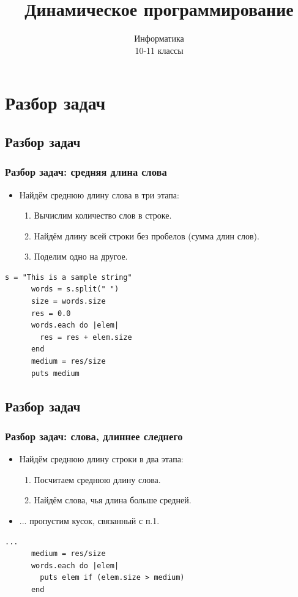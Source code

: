 \documentclass[compress,red]{beamer}
\title{Динамическое программирование}
\author{Информатика \\ 10-11 классы}
\begin{document}
\maketitle

\section{Разбор задач}
\subsection{Разбор задач}
\begin{frame}[fragile]
\frametitle{Разбор задач: средняя длина слова}
		\begin{itemize}
		\item Найдём среднюю длину слова в три этапа:
		  \begin{enumerate}
		    \item Вычислим количество слов в строке.
		    \item Найдём длину всей строки без пробелов (сумма длин слов).
		    \item Поделим одно на другое.
		  \end{enumerate}
		\end{itemize}
		\scriptsize{
    \begin{lstlisting}[label=ruby1,caption=Средняя длина слова]
      s = "This is a sample string"
      words = s.split(" ")
      size = words.size
      res = 0.0
      words.each do |elem|
        res = res + elem.size
      end
      medium = res/size
      puts medium
    \end{lstlisting}}
\end{frame}

\subsection{Разбор задач}
\begin{frame}[fragile]
\frametitle{Разбор задач: слова, длиннее следнего }
		\begin{itemize}
		\item Найдём среднюю длину строки в два этапа:
		  \begin{enumerate}
		    \item Посчитаем среднюю длину слова.
		    \item Найдём слова, чья длина больше средней.
		  \end{enumerate}
		\item  ... пропустим кусок, связанный с п.1.
		\end{itemize}
		\scriptsize{
    \begin{lstlisting}[label=ruby2,caption=Длиннее среднего]
      ...
      medium = res/size
      words.each do |elem|
        puts elem if (elem.size > medium)
      end
    \end{lstlisting}}
\end{frame}
\end{document}
